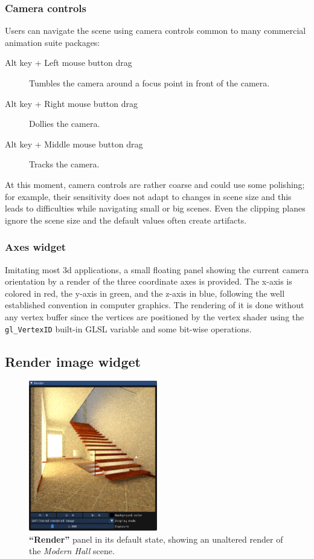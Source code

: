 
\subsubsection{Camera controls}
Users can navigate the scene using camera controls common to many commercial animation suite packages:
\begin{description}
	\item[Alt key + Left mouse button drag] Tumbles the camera around a focus point in front of the camera.
	\item[Alt key + Right mouse button drag] Dollies the camera.
	\item[Alt key + Middle mouse button drag] Tracks the camera. 
\end{description}
At this moment, camera controls are rather coarse and could use some polishing; for example, their sensitivity does not adapt to changes in scene size and this leads to difficulties while navigating small or big scenes. Even the clipping planes ignore the scene size and the default values often create artifacts.

\subsubsection{Axes widget}

Imitating most 3d applications, a small floating panel showing the current camera orientation by a render of the three coordinate axes is provided. The x-axis is colored in red, the y-axis in green, and the z-axis in blue, following the well established convention in computer graphics. The rendering of it is done without any vertex buffer since the vertices are positioned by the vertex shader using the \texttt{gl\_VertexID} built-in GLSL variable and some bit-wise operations. 

\subsection{Render image widget}

\begin{figure}
	\centering
	\includegraphics[width=0.5\textwidth]{chapters/chapter_thetool/imagewidget_full}
	\caption{\textbf{“Render”} panel in its default state, showing an unaltered render of the \textit{Modern Hall} \cite{bitterliscenes} scene.}
	\label{imagewidget_full}
\end{figure}

